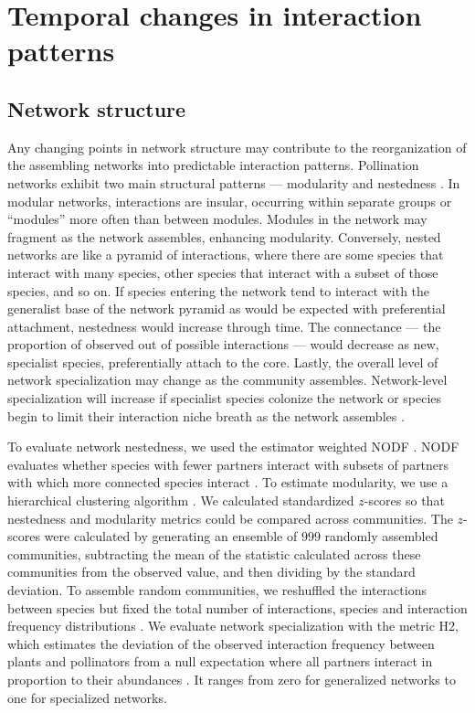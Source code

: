 \documentclass[12pt]{article}
\begin{document}
\section*{Temporal changes in interaction patterns}

\subsection*{Network structure}
Any changing points in network structure may contribute to the
reorganization of the assembling networks into predictable interaction
patterns. Pollination networks exhibit two main structural patterns
--- modularity \citep[e.g.,][]{Olesen2007} and nestedness
\citep[e.g.,][]{Bascompte2006, Bascompte2003}. In modular networks,
interactions are insular, occurring within separate groups or
``modules'' more often than between modules. Modules in the network
may fragment as the network assembles, enhancing
modularity. Conversely, nested networks are like a pyramid of
interactions, where there are some species that interact with many
species, other species that interact with a subset of those species,
and so on. If species entering the network tend to interact with the
generalist base of the network pyramid as would be expected with
preferential attachment, nestedness would increase through time. The
connectance --- the proportion of observed out of possible
interactions --- would decrease as new, specialist species,
preferentially attach to the core.  Lastly, the overall level of
network specialization may change as the community
assembles. Network-level specialization will increase if specialist
species colonize the network or species begin to limit their
interaction niche breath as the network assembles
\citep{bluthgen-2006-9}.

To evaluate network nestedness, we used the estimator weighted NODF
\citep{nodf}. NODF evaluates whether species with fewer partners
interact with subsets of partners with which more connected species
interact \citep{nodf}. To estimate modularity, we use a hierarchical
clustering algorithm \citep{Newman2004, igraph}.  We calculated
standardized $z$-scores so that nestedness and modularity metrics
could be compared across communities. The $z$-scores were calculated
by generating an ensemble of $999$ randomly assembled communities,
subtracting the mean of the statistic calculated across these
communities from the observed value, and then dividing by the standard
deviation. To assemble random communities, we reshuffled the
interactions between species but fixed the total number of
interactions, species and interaction frequency distributions
\citep{Galeano2009}. We evaluate network specialization with the
metric H2, which estimates the deviation of the observed interaction
frequency between plants and pollinators from a null expectation where
all partners interact in proportion to their abundances
\citep{bluthgen-2006-9}. It ranges from zero for generalized networks
to one for specialized networks.
\end{document}

